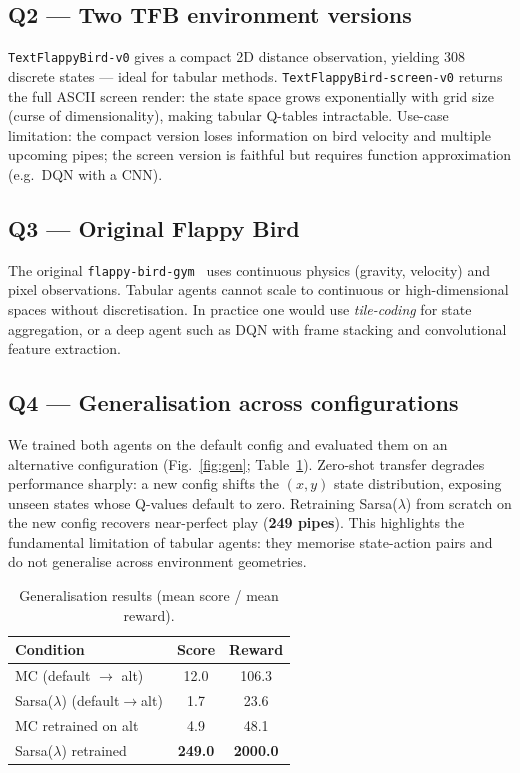 \documentclass[runningheads]{llncs}
\begin{document}
\subsection*{Q2 — Two TFB environment versions}

\texttt{TextFlappyBird-v0} gives a compact 2D distance observation, yielding
308 discrete states — ideal for tabular methods.
\texttt{TextFlappyBird-screen-v0} returns the full ASCII screen render:
the state space grows exponentially with grid size (curse of dimensionality),
making tabular Q-tables intractable.
Use-case limitation: the compact version loses information on bird velocity
and multiple upcoming pipes; the screen version is faithful but requires function
approximation (e.g.\ DQN with a CNN).

\subsection*{Q3 — Original Flappy Bird}

The original \texttt{flappy-bird-gym}~\cite{talendar2021fbgym} uses continuous
physics (gravity, velocity) and pixel observations.
Tabular agents cannot scale to continuous or high-dimensional spaces without
discretisation.
In practice one would use \emph{tile-coding} for state aggregation, or a deep
agent such as DQN with frame stacking and convolutional feature extraction.

\subsection*{Q4 — Generalisation across configurations}
\label{sec:gen}

We trained both agents on the default config and evaluated them on an
alternative configuration (Fig.~\ref{fig:gen}; Table~\ref{tab:gen}).
Zero-shot transfer degrades performance sharply: a new config shifts the
$(x,y)$ state distribution, exposing unseen states whose Q-values default
to zero. Retraining Sarsa($\lambda$) from scratch on the new config recovers
near-perfect play (\textbf{249 pipes}).
This highlights the fundamental limitation of tabular agents: they memorise
state-action pairs and do not generalise across environment geometries.

\begin{table}[H]
  \centering
  \caption{Generalisation results (mean score / mean reward).}
  \label{tab:gen}
  \small
  \begin{tabular}{lcc}
    \toprule
    Condition & Score & Reward \\
    \midrule
    MC (default $\to$ alt)          & 12.0 & 106.3 \\
    Sarsa($\lambda$) (default$\to$alt) & 1.7  & 23.6  \\
    MC retrained on alt             & 4.9  & 48.1  \\
    Sarsa($\lambda$) retrained       & \textbf{249.0} & \textbf{2000.0} \\
    \bottomrule
  \end{tabular}
\end{table}
\end{document}
